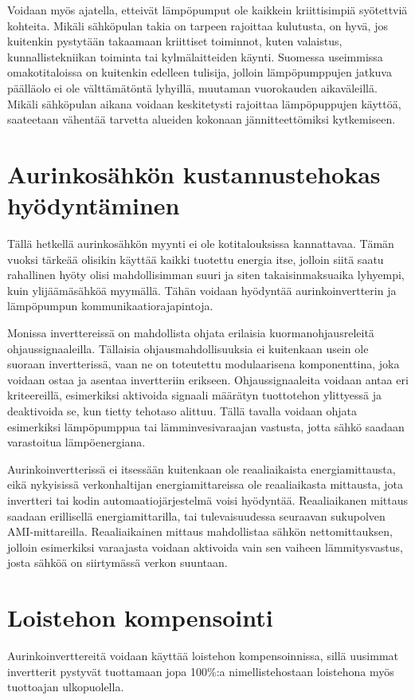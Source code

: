   Voidaan myös ajatella, etteivät lämpöpumput ole kaikkein kriittisimpiä syötettviä kohteita. Mikäli sähköpulan takia on tarpeen rajoittaa kulutusta, on hyvä, jos kuitenkin pystytään takaamaan kriittiset toiminnot, kuten valaistus, kunnallistekniikan toiminta tai kylmälaitteiden käynti. Suomessa useimmissa omakotitaloissa on kuitenkin edelleen tulisija, jolloin lämpöpumppujen jatkuva päälläolo ei ole välttämätöntä lyhyillä, muutaman vuorokauden aikaväleillä. Mikäli sähköpulan aikana voidaan keskitetysti rajoittaa lämpöpuppujen käyttöä, saateetaan vähentää tarvetta alueiden kokonaan jännitteettömiksi kytkemiseen.

\section{Aurinkosähkön kustannustehokas hyödyntäminen}

  Tällä hetkellä aurinkosähkön myynti ei ole kotitalouksissa kannattavaa. Tämän vuoksi tärkeää olisikin käyttää kaikki tuotettu energia itse, jolloin siitä saatu rahallinen hyöty olisi mahdollisimman suuri ja siten takaisinmaksuaika lyhyempi, kuin ylijäämäsähköä myymällä. Tähän voidaan hyödyntää aurinkoinvertterin ja lämpöpumpun kommunikaatiorajapintoja.

  Monissa inverttereissä on mahdollista ohjata erilaisia kuormanohjausreleitä ohjaussignaaleilla. Tällaisia ohjausmahdollisuuksia ei kuitenkaan usein ole suoraan invertterissä, vaan ne on toteutettu modulaarisena komponenttina, joka voidaan ostaa ja asentaa invertteriin erikseen. Ohjaussignaaleita voidaan antaa eri kriteereillä, esimerkiksi aktivoida signaali määrätyn tuottotehon ylittyessä ja deaktivoida se, kun tietty tehotaso alittuu. Tällä tavalla voidaan ohjata esimerkiksi lämpöpumppua tai lämminvesivaraajan vastusta, jotta sähkö saadaan varastoitua lämpöenergiana.

  Aurinkoinvertterissä ei itsessään kuitenkaan ole reaaliaikaista energiamittausta, eikä nykyisissä verkonhaltijan energiamittareissa ole reaaliaikasta mittausta, jota invertteri tai kodin automaatiojärjestelmä voisi hyödyntää. Reaaliaikanen mittaus saadaan erillisellä energiamittarilla, tai tulevaisuudessa seuraavan sukupolven AMI-mittareilla. Reaaliaikainen mittaus mahdollistaa sähkön nettomittauksen, jolloin esimerkiksi varaajasta voidaan aktivoida vain sen vaiheen lämmitysvastus, josta sähköä on siirtymässä verkon suuntaan.

\section{Loistehon kompensointi}
  Aurinkoinverttereitä voidaan käyttää loistehon kompensoinnissa, sillä uusimmat invertterit pystyvät tuottamaan jopa 100\%:a nimellistehostaan loistehona myös tuottoajan ulkopuolella.

